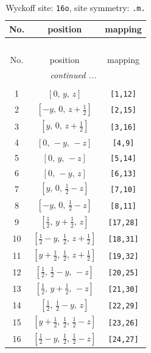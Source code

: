 \documentclass[fleqn,8pt]{jsarticle}
\begin{document}
\renewcommand{\arraystretch}{1.2}
\begin{longtable}{ccc}
\caption{Wyckoff site: {\tt 16o}, site symmetry: {\tt .m.}}
 \\
 \hline \hline
No. & position & mapping \\ \hline \endfirsthead

\multicolumn{2}{l}{\tablename\ \thetable{}} \\
 \hline \hline
No. & position & mapping \\ \hline \endhead

 \hline \hline
\multicolumn{2}{r}{\footnotesize\it continued ...} \\ \endfoot

 \hline \hline
\multicolumn{2}{r}{} \\ \endlastfoot

1 & $\left[ 0,\, y,\, z \right]$ & {\tt [1,12]} \\ \hline
2 & $\left[ - y,\, 0,\, z + \frac{1}{2} \right]$ & {\tt [2,15]} \\ \hline
3 & $\left[ y,\, 0,\, z + \frac{1}{2} \right]$ & {\tt [3,16]} \\ \hline
4 & $\left[ 0,\, - y,\, - z \right]$ & {\tt [4,9]} \\ \hline
5 & $\left[ 0,\, y,\, - z \right]$ & {\tt [5,14]} \\ \hline
6 & $\left[ 0,\, - y,\, z \right]$ & {\tt [6,13]} \\ \hline
7 & $\left[ y,\, 0,\, \frac{1}{2} - z \right]$ & {\tt [7,10]} \\ \hline
8 & $\left[ - y,\, 0,\, \frac{1}{2} - z \right]$ & {\tt [8,11]} \\ \hline
9 & $\left[ \frac{1}{2},\, y + \frac{1}{2},\, z \right]$ & {\tt [17,28]} \\ \hline
10 & $\left[ \frac{1}{2} - y,\, \frac{1}{2},\, z + \frac{1}{2} \right]$ & {\tt [18,31]} \\ \hline
11 & $\left[ y + \frac{1}{2},\, \frac{1}{2},\, z + \frac{1}{2} \right]$ & {\tt [19,32]} \\ \hline
12 & $\left[ \frac{1}{2},\, \frac{1}{2} - y,\, - z \right]$ & {\tt [20,25]} \\ \hline
13 & $\left[ \frac{1}{2},\, y + \frac{1}{2},\, - z \right]$ & {\tt [21,30]} \\ \hline
14 & $\left[ \frac{1}{2},\, \frac{1}{2} - y,\, z \right]$ & {\tt [22,29]} \\ \hline
15 & $\left[ y + \frac{1}{2},\, \frac{1}{2},\, \frac{1}{2} - z \right]$ & {\tt [23,26]} \\ \hline
16 & $\left[ \frac{1}{2} - y,\, \frac{1}{2},\, \frac{1}{2} - z \right]$ & {\tt [24,27]} \\
\end{longtable}
\end{document}
